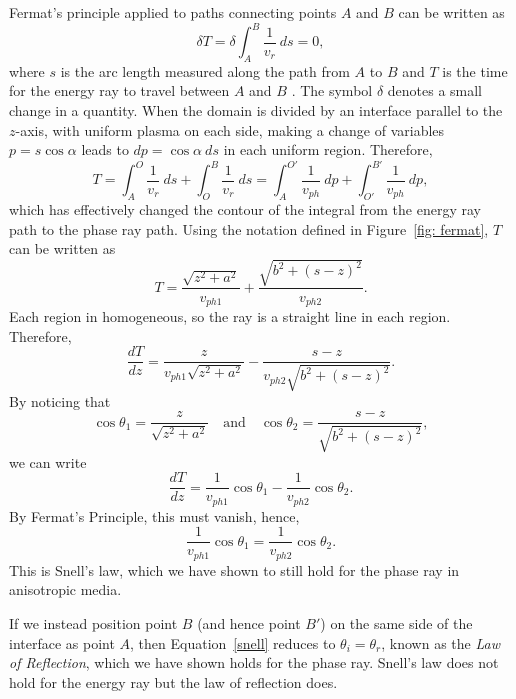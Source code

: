 	Fermat's principle applied to paths connecting points $A$ and $B$ can be written as
	\begin{equation}
	\delta T = \delta \int_A^B \frac{1}{v_r} ~ds = 0,
	\end{equation}
	where $s$ is the arc length measured along the path from $A$ to $B$ and $T$ is the time for the energy ray to travel between $A$ and $B$ \citep{bor_etal99}. The symbol $\delta$ denotes a small change in a quantity. When the domain is divided by an interface parallel to the $z$-axis, with uniform plasma on each side, making a change of variables $p = s \cos{\alpha}$ leads to $dp = \cos{\alpha} ~ds$ in each uniform region. Therefore, 
	\begin{equation}
	T = \int_A^O \frac{1}{v_r} ~ds + \int_O^B \frac{1}{v_r} ~ds = \int_A^{O'} \frac{1}{v_{ph}} ~dp + \int_{O'}^{B'} \frac{1}{v_{ph}} ~dp,
	\end{equation}
	which has effectively changed the contour of the integral from the energy ray path to the phase ray path. Using the notation defined in Figure~\ref{fig: fermat}, $T$ can be written as
	\begin{equation}
	T = \frac{\sqrt{z^2 + a^2}}{v_{ph1}} + \frac{\sqrt{b^2 + (s-z)^2}}{v_{ph2}}.
	\end{equation}
	Each region in homogeneous, so the ray is a straight line in each region. Therefore,
	\begin{equation}
	\frac{dT}{dz} = \frac{z}{v_{ph1}\sqrt{z^2 + a^2}} - \frac{s - z}{v_{ph2}\sqrt{b^2 + (s - z)^2}}.
	\end{equation}
	By noticing that
	\begin{equation}
	\cos{\theta_1} = \frac{z}{\sqrt{z^2 + a^2}} \quad \text{and} \quad \cos{\theta_2} = \frac{s - z}{\sqrt{b^2 + (s - z)^2}},
	\end{equation}
	we can write
	\begin{equation}
	\frac{dT}{dz} = \frac{1}{v_{ph1}}\cos{\theta_1} - \frac{1}{v_{ph2}}\cos{\theta_2}.
	\end{equation}
	By Fermat's Principle, this must vanish, hence,
	\begin{equation}
	\frac{1}{v_{ph1}}\cos{\theta_1} = \frac{1}{v_{ph2}}\cos{\theta_2}. \label{snell}
	\end{equation}
	This is Snell's law, which we have shown to still hold for the phase ray in anisotropic media.
	
	If we instead position point $B$ (and hence point $B'$) on the same side of the interface as point $A$, then Equation~\eqref{snell} reduces to $\theta_i = \theta_r$, known as the \textit{Law of Reflection}, which we have shown holds for the phase ray. Snell's law does not hold for the energy ray but the law of reflection does.
	
